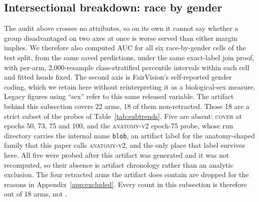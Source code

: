 \documentclass{article}
\begin{document}
\subsection{Intersectional breakdown: race by gender}
\label{app:intersectional}

The audit above crosses no attributes, so on its own it cannot say whether a
group disadvantaged on two axes at once is worse served than either margin
implies. We therefore also computed AUC for all six race-by-gender cells of the
test split, from the same saved predictions, under the same exact-label join
proof, with per-arm, 2{,}000-resample class-stratified percentile intervals
within each cell and fitted heads fixed. The second axis is FairVision's self-reported gender coding,
which we retain here without reinterpreting it as a biological-sex measure.
Legacy figures using ``sex'' refer to this same released variable.
The artifact behind this subsection
covers 22 arms, 18 of them non-retracted. Those 18 are a strict subset of the
\NprobesSub{} probes of Table~\ref{tab:subtrends}. Five are absent:
\textsc{cover} at epochs 50, 73, 75 and 100, and the \textsc{anatomy-v2}
epoch-75 probe, whose run directory carries the internal name \texttt{blob},
an artifact label for the anatomy-shaped family that this paper calls
\textsc{anatomy-v2}, and the only place that label survives here. All five were
probed after this
artifact was generated and it was not recomputed, so their absence is artifact
chronology rather than an analytic exclusion. The four retracted arms the
artifact does contain are dropped for the reasons in
Appendix~\ref{app:excluded}. Every count in this subsection is therefore
out of 18 arms, not \NprobesSub{}.
\end{document}
